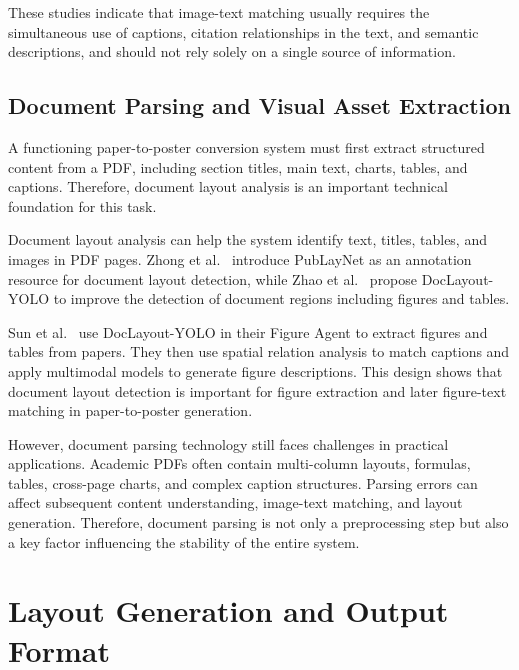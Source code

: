 \documentclass[12pt,oneside]{report}
\begin{document}
\vspace{1em}

These studies indicate that image-text matching usually requires the simultaneous use of captions, citation relationships in the text, and semantic descriptions, and should not rely solely on a single source of information.

\subsection{Document Parsing and Visual Asset Extraction}

A functioning paper-to-poster conversion system must first extract structured content from a PDF, including section titles, main text, charts, tables, and captions. Therefore, document layout analysis is an important technical foundation for this task.

\vspace{1em}

Document layout analysis can help the system identify text, titles, tables, and images in PDF pages. Zhong et al.~\cite{publaynet} introduce PubLayNet as an annotation resource for document layout detection, while Zhao et al.~\cite{doclayoutyolo} propose DocLayout-YOLO to improve the detection of document regions including figures and tables.

\vspace{1em}

Sun et al.~\cite{p2p} use DocLayout-YOLO in their Figure Agent to extract figures and tables from papers. They then use spatial relation analysis to match captions and apply multimodal models to generate figure descriptions. This design shows that document layout detection is important for figure extraction and later figure-text matching in paper-to-poster generation.

\vspace{1em}

However, document parsing technology still faces challenges in practical applications. Academic PDFs often contain multi-column layouts, formulas, tables, cross-page charts, and complex caption structures. Parsing errors can affect subsequent content understanding, image-text matching, and layout generation. Therefore, document parsing is not only a preprocessing step but also a key factor influencing the stability of the entire system.

\section{Layout Generation and Output Format}
\end{document}
